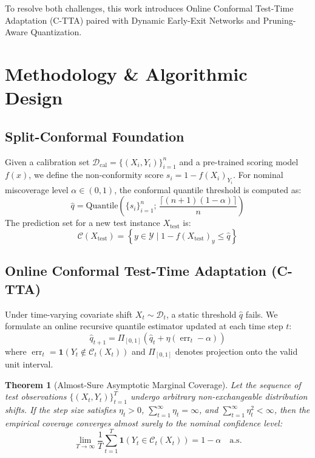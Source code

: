 \documentclass[journal,twocolumn,letterpaper]{IEEEtran}
\newtheorem{theorem}{Theorem}
\begin{document}
To resolve both challenges, this work introduces Online Conformal Test-Time Adaptation (C-TTA) paired with Dynamic Early-Exit Networks and Pruning-Aware Quantization.

\section{Methodology \& Algorithmic Design}

\subsection{Split-Conformal Foundation}
Given a calibration set $\mathcal{D}_{\text{cal}} = \{(X_i, Y_i)\}_{i=1}^n$ and a pre-trained scoring model $f(x)$, we define the non-conformity score $s_i = 1 - f(X_i)_{Y_i}$. For nominal miscoverage level $\alpha \in (0, 1)$, the conformal quantile threshold is computed as:
\begin{equation}
\hat{q} = \text{Quantile}\left( \{s_i\}_{i=1}^n; \, \frac{\lceil(n+1)(1-\alpha)\rceil}{n} \right)
\end{equation}
The prediction set for a new test instance $X_{\text{test}}$ is:
\begin{equation}
\mathcal{C}(X_{\text{test}}) = \left\{ y \in \mathcal{Y} \mid 1 - f(X_{\text{test}})_y \le \hat{q} \right\}
\end{equation}

\subsection{Online Conformal Test-Time Adaptation (C-TTA)}
Under time-varying covariate shift $X_t \sim \mathcal{D}_t$, a static threshold $\hat{q}$ fails. We formulate an online recursive quantile estimator updated at each time step $t$:
\begin{equation}
\hat{q}_{t+1} = \Pi_{[0, 1]} \left( \hat{q}_t + \eta \left( \operatorname{err}_t - \alpha \right) \right)
\end{equation}
where $\operatorname{err}_t = \mathbf{1}(Y_t \notin \mathcal{C}_t(X_t))$ and $\Pi_{[0, 1]}$ denotes projection onto the valid unit interval.

\begin{theorem}[Almost-Sure Asymptotic Marginal Coverage]
Let the sequence of test observations $\{(X_t, Y_t)\}_{t=1}^T$ undergo arbitrary non-exchangeable distribution shifts. If the step size satisfies $\eta_t > 0$, $\sum_{t=1}^\infty \eta_t = \infty$, and $\sum_{t=1}^\infty \eta_t^2 < \infty$, then the empirical coverage converges almost surely to the nominal confidence level:
\begin{equation}
\lim_{T \to \infty} \frac{1}{T} \sum_{t=1}^T \mathbf{1}\left(Y_t \in \mathcal{C}_t(X_t)\right) = 1 - \alpha \quad \text{a.s.}
\end{equation}
\end{theorem}
\end{document}
